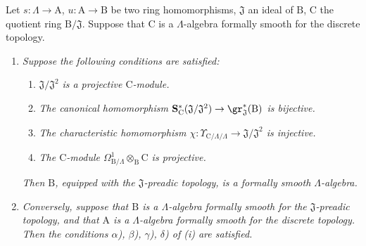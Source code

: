 \begin{theorem}[22.1.1]
\label{0.22.1.1}
Let $s:\Lambda\to\mathrm{A}$, $u:\mathrm{A}\to\mathrm{B}$ be two ring homomorphisms, $\mathfrak{J}$ an ideal of $\mathrm{B}$, $\mathrm{C}$ the quotient ring $\mathrm{B}/\mathfrak{J}$.
Suppose that $\mathrm{C}$ is a $\Lambda$-algebra formally smooth for the discrete topology.
\begin{enumerate}
  \item[\rm{(i)}] \emph{Suppose the following conditions are satisfied:}
  \begin{enumerate}
    \item[$\alpha$)] $\mathfrak{J}/\mathfrak{J}^2$ \emph{is a projective $\mathrm{C}$-module.}
    \item[$\beta$)] \emph{The canonical homomorphism $\mathbf{S}^*_\mathrm{C}(\mathfrak{J}/\mathfrak{J}^2)\to\gr^*_\mathfrak{J}(\mathrm{B})$  is bijective.}
    \item[$\gamma$)] \emph{The characteristic homomorphism $\chi:\Upsilon_{\mathrm{C}/\Lambda/\Lambda}\to\mathfrak{J}/\mathfrak{J}^2$  is injective.}
    \item[$\delta$)] \emph{The $\mathrm{C}$-module $\Omega^1_{\mathrm{B}/\Lambda}\otimes_\mathrm{B}\mathrm{C}$ is projective.}
  \end{enumerate}
  \emph{Then $\mathrm{B}$, equipped with the $\mathfrak{J}$-preadic topology, is a formally smooth $\Lambda$-algebra.}
  \item[\rm{(ii)}] \emph{Conversely, suppose that $\mathrm{B}$ is a $\Lambda$-algebra formally smooth for the $\mathfrak{J}$-preadic topology, and that $\mathrm{A}$ is a $\Lambda$-algebra formally smooth for the discrete topology.
  Then the conditions $\alpha$), $\beta$), $\gamma$), $\delta$) of \rm{(i)} are satisfied.}
\end{enumerate}
\end{theorem}

